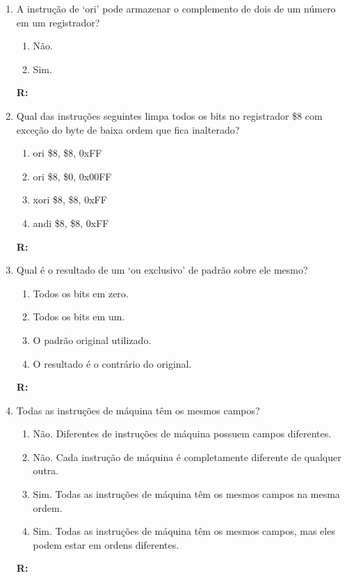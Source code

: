 \documentclass[a4paper,11pt]{article}
\begin{document}
\begin{enumerate}
    \item{A instrução de `ori' pode armazenar o complemento de dois de um número em um registrador?}
        \begin{enumerate}
            \item{Não.}
            \item{Sim.}
        \end{enumerate}
        \textbf{R:}

    \item{Qual das instruções seguintes limpa todos os bits no registrador \$8 com exceção do byte de
            baixa ordem que fica inalterado?}
        \begin{enumerate}
            \item{ori \$8, \$8, 0xFF}
            \item{ori \$8, \$0, 0x00FF}
            \item{xori \$8, \$8, 0xFF}
            \item{andi \$8, \$8, 0xFF}
        \end{enumerate}
        \textbf{R: }

    \item{Qual é o resultado de um `ou exclusivo' de padrão sobre ele mesmo?}
        \begin{enumerate}
            \item{Todos os bits em zero.}
            \item{Todos os bits em um.}
            \item{O padrão original utilizado.}
            \item{O resultado é o contrário do original.}
        \end{enumerate}
        \textbf{R:}

    \item{Todas as instruções de máquina têm os mesmos campos?}
        \begin{enumerate}
            \item{Não. Diferentes de instruções de máquina possuem campos diferentes.}
            \item{Não. Cada instrução de máquina é completamente diferente de qualquer outra.}
            \item{Sim. Todas as instruções de máquina têm os mesmos campos na mesma ordem.}
            \item{Sim. Todas as instruções de máquina têm os mesmos campos, mas eles podem estar em ordens
                    diferentes.}
        \end{enumerate}
        \textbf{R:}


\end{enumerate}
\end{document}
